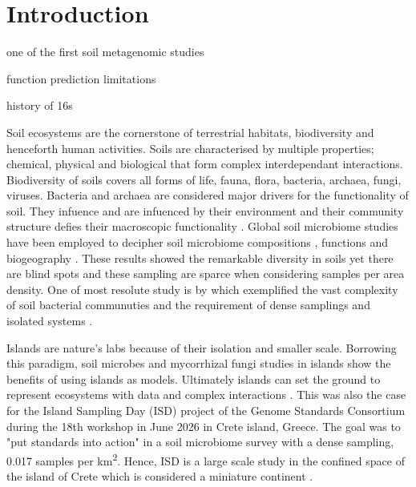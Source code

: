 \documentclass[unnumsec,webpdf,contemporary,large]{oup-authoring-template}%
\theoremstyle{thmstyleone}%
\theoremstyle{thmstyletwo}%
\theoremstyle{thmstylethree}%
\begin{document}
\maketitle

\section{Introduction}\label{intro}

one of the first soil metagenomic studies \cite{fierer2012cross-biome}

function prediction limitations \cite{matchado2024on-the-limits}

history of 16s \cite{}

\cite{baykal2024genomic}
Soil ecosystems are the cornerstone of terrestrial habitats, biodiversity and henceforth human activities.
Soils are characterised by multiple properties; chemical, physical and biological that 
form complex interdependant interactions. Biodiversity of soils covers
all forms of life, fauna, flora, bacteria, archaea, fungi, viruses. 
Bacteria and archaea are considered major drivers for the functionality of soil.
They infuence and are infuenced by their environment and their community structure 
defies their macroscopic functionality \cite{Bahram2018}.
Global soil microbiome studies have been employed to decipher soil microbiome
compositions \cite{thompson2017a-communal, Delgado-Baquerizo2018, Labouyrie2023},
functions \cite{Bahram2018} and biogeography \cite{Martiny2006, Guerra2020}.
These results showed the remarkable diversity in soils yet there are blind spots \cite{Guerra2020}
and these sampling are sparce when considering samples per area density. One of most resolute
study is by \cite{Karimi2020} which exemplified the 
vast complexity of soil bacterial communuties and the requirement of
dense samplings and isolated systems \cite{Dini-Andreote2021}.

Islands are nature's labs \cite{Whittaker2017} because of their isolation and smaller scale.
Borrowing this paradigm, soil microbes \cite{Li2020} and mycorrhizal fungi \cite{Delavaux2021} studies
in islands show the benefits of using islands as models. Ultimately islands can
set the ground to represent ecosystems with data and complex interactions \cite{Davies2016}.
This was also the case for the Island Sampling Day (ISD) project \cite{holm2024}
of the Genome Standards Consortium \cite{Field2011}
during the 18th workshop in June 2026 in Crete island, Greece. The goal was to "put standards into action"
in a soil microbiome survey with a dense sampling, 0.017 samples per km\textsuperscript{2}.
Hence, ISD is a large scale study in the confined space of the island of Crete which 
is considered a miniature continent \cite{Vogiatzakis2008_crete}.
\end{document}
